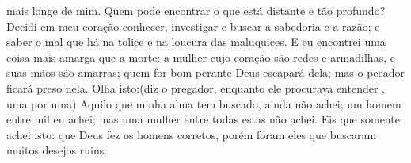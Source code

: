 {{} mais longe de mim.
  Quem pode encontrar o que está distante e tão profundo?
  Decidi em meu coração conhecer, investigar e buscar a sabedoria e a razão; e saber o mal que há na tolice e na loucura das maluquices.
  E eu encontrei uma coisa mais amarga que a morte: a mulher cujo coração são redes e armadilhas, e suas mãos são amarras; quem for bom perante Deus escapará dela; mas o pecador ficará preso nela.
  Olha isto:(diz o pregador, enquanto ele procurava entender
{}, uma por uma)
  Aquilo que minha alma tem buscado, ainda não achei; um homem entre mil eu achei; mas uma mulher entre todas estas não achei.
  Eis que somente achei isto: que Deus fez os homens corretos, porém foram eles que buscaram muitos desejos ruins.
\par }

